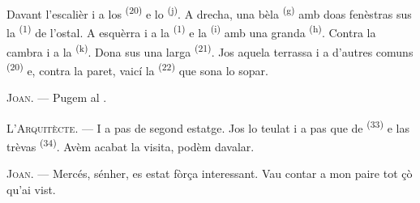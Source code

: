 \VUsaut{3.0mm}
\VUsaut{3.0mm}

Davant l'escalièr i a los  \textsuperscript{(20)} e lo
 \textsuperscript{(j)}. A drecha, una bèla
 \textsuperscript{(g)} amb doas fenèstras sus la 
\textsuperscript{(1)} de l'ostal. A esquèrra i a la 
\textsuperscript{(1)} e la  \textsuperscript{(i)} amb una
granda  \textsuperscript{(h)}. Contra la cambra i a la
 \textsuperscript{(k)}. Dona sus una larga
 \textsuperscript{(21)}. Jos aquela terrassa i a d'autres comuns
\textsuperscript{(20)} e, contra la paret, vaicí la 
\textsuperscript{(22)} que sona lo sopar.

\textsc{Joan}. --- Pugem al .

\textsc{L'Arquitècte}. --- I a pas de segond estatge. Jos lo teulat i a pas que de
 \textsuperscript{(33)} e las trèvas \textsuperscript{(34)}.
Avèm acabat la visita, podèm davalar.

\textsc{Joan}. --- Mercés, sénher, es estat fòrça interessant. Vau contar a mon
paire tot çò qu'ai vist.
\VUsaut{4.0mm}
\VUfilet{22mm}
